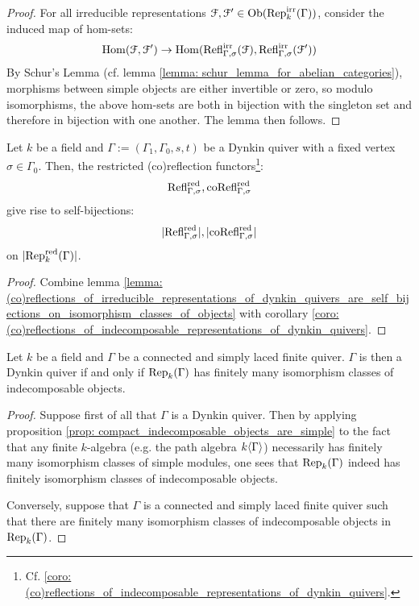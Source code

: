                 \begin{proof}
                    For all irreducible representations $\mathcal{F}, \mathcal{F}' \in \mathrm{Ob}(\mathrm{Rep}_k^{\mathrm{irr}}(\Gamma))$, consider the induced map of hom-sets:
                        $$\mathrm{Hom}(\mathcal{F}, \mathcal{F}') \to \mathrm{Hom}(\mathrm{Refl}_{\Gamma, \sigma}^{\mathrm{irr}}(\mathcal{F}), \mathrm{Refl}_{\Gamma, \sigma}^{\mathrm{irr}}(\mathcal{F}'))$$
                    By Schur's Lemma (cf. lemma \ref{lemma: schur_lemma_for_abelian_categories}), morphisms between simple objects are either invertible or zero, so modulo isomorphisms, the above hom-sets are both in bijection with the singleton set and therefore in bijection with one another. The lemma then follows. 
                \end{proof}
            \begin{corollary} \label{coro: (co)reflections_of_indecomposable_representations_of_dynkin_quivers_are_self_bijections_on_isomorphism_classes_of_objects}
                Let $k$ be a field and $\Gamma := (\Gamma_1, \Gamma_0, s, t)$ be a Dynkin quiver with a fixed vertex $\sigma \in \Gamma_0$. Then, the restricted (co)reflection functors\footnote{Cf. \ref{coro: (co)reflections_of_indecomposable_representations_of_dynkin_quivers}.}:
                    $$\mathrm{Refl}_{\Gamma, \sigma}^{\mathrm{red}}, \mathrm{co}\mathrm{Refl}_{\Gamma, \sigma}^{\mathrm{red}}$$
                give rise to self-bijections:
                    $$|\mathrm{Refl}_{\Gamma, \sigma}^{\mathrm{red}}|, |\mathrm{co}\mathrm{Refl}_{\Gamma, \sigma}^{\mathrm{red}}|$$
                on $|\mathrm{Rep}_k^{\mathrm{red}}(\Gamma)|$.
            \end{corollary}
                \begin{proof}
                    Combine lemma \ref{lemma: (co)reflections_of_irreducible_representations_of_dynkin_quivers_are_self_bijections_on_isomorphism_classes_of_objects} with corollary \ref{coro: (co)reflections_of_indecomposable_representations_of_dynkin_quivers}.
                \end{proof}
            \begin{theorem} \label{theorem: gabriel_theorem_on_dynkin_quivers}
                Let $k$ be a field and $\Gamma$ be a connected and simply laced finite quiver. $\Gamma$ is then a Dynkin quiver if and only if $\mathrm{Rep}_k(\Gamma)$ has finitely many isomorphism classes of indecomposable objects.
            \end{theorem}
                \begin{proof}
                    Suppose first of all that $\Gamma$ is a Dynkin quiver. Then by applying proposition \ref{prop: compact_indecomposable_objects_are_simple} to the fact that any finite $k$-algebra (e.g. the path algebra $k\langle\Gamma\rangle$) necessarily has finitely many isomorphism classes of simple modules, one sees that $\mathrm{Rep}_k(\Gamma)$ indeed has finitely isomorphism classes of indecomposable objects.
                    
                    Conversely, suppose that $\Gamma$ is a connected and simply laced finite quiver such that there are finitely many isomorphism classes of indecomposable objects in $\mathrm{Rep}_k(\Gamma)$.
                \end{proof}
